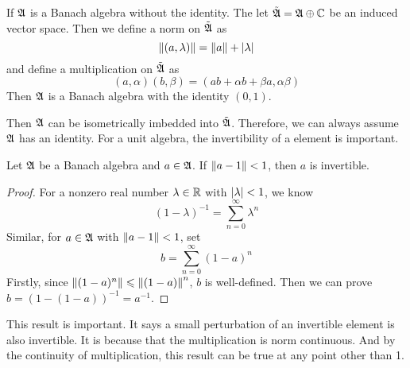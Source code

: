 \documentclass[a4paper,11pt]{report}
\begin{document}
\begin{prop}
	If $\mathfrak{A}$ is a Banach algebra without the identity. The let $\tilde{\mathfrak{A}}= \mathfrak{A} \oplus \mathbb{C}$ be an induced vector space. Then we define a norm on $\tilde{\mathfrak{A}}$ as
	\begin{equation*}
		\left\lVert(a,\lambda)\right\lVert = \left\lVert a\right\lVert + \left\lvert\lambda\right\lvert
	\end{equation*}
	and define a multiplication on $\tilde{\mathfrak{A}}$ as
	\begin{equation*}
		(a,\alpha)(b,\beta) = (ab+\alpha b + \beta a, \alpha \beta)
	\end{equation*}
	Then $\mathfrak{A}$ is a Banach algebra with the identity $(0,1)$.
\end{prop}

Then $\mathfrak{A}$ can be isometrically imbedded into $\tilde{\mathfrak{A}}$. Therefore, we can always assume $\mathfrak{A}$ has an identity. For a unit algebra, the invertibility of a element is important. 

\begin{thm}
	Let $\mathfrak{A}$ be a Banach algebra and $a \in \mathfrak{A}$. If $\left\lVert a-1\right\lVert < 1$, then $a$ is invertible.
\end{thm}
\begin{proof}
	For a nonzero real number $\lambda \in \mathbb{R}$ with $\left\lvert\lambda\right\lvert < 1$, we know 
	\begin{equation*}
		(1-\lambda)^{-1} = \sum_{n=0}^{\infty} \lambda^{n}
	\end{equation*}
	Similar, for $a \in \mathfrak{A}$ with $\left\lVert a-1\right\lVert < 1$, set
	\begin{equation*}
		b= \sum_{n=0}^{\infty} (1-a)^{n}
	\end{equation*}
	Firstly, since $\left\lVert(1-a)^{n}\right\lVert \leqslant \left\lVert(1-a)\right\lVert^{n}$, $b$ is well-defined. Then we can prove $b = (1-(1-a))^{-1} = a^{-1}$.
\end{proof}
\begin{rem}
	This result is important. It says a small perturbation of an invertible element is also invertible. It is because that the multiplication is norm continuous. And by the continuity of multiplication, this result can be true at any point other than 1.
\end{rem}
\end{document}
